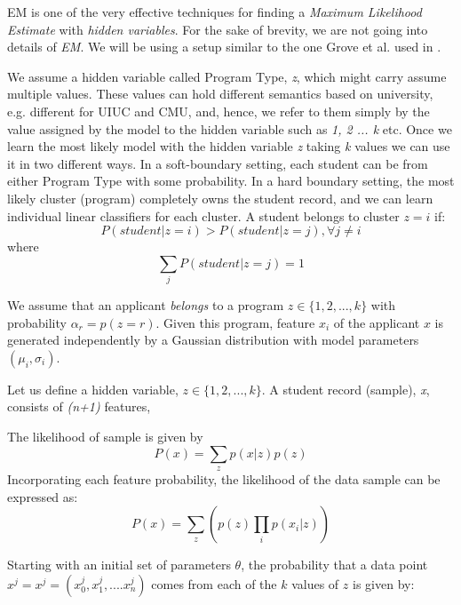 \documentclass{sig-alternate-05-2015}
\begin{document}
EM is one of the very effective techniques for finding a \textit{Maximum Likelihood Estimate} with \textit{hidden variables}. For the sake of brevity, we are not going into details of \textit{EM}. We will be using a setup similar to the one Grove et al. used in \cite{GroveRoth}.

We assume a hidden variable called Program Type, \textit{z}, which might carry assume multiple values. These values can hold different semantics based on university, e.g. different for UIUC and CMU, and, hence, we refer to them simply by the value assigned by the model to the hidden variable such as \textit{1, 2 ... k} etc. Once we learn the most likely model with the hidden variable \textit{z} taking \textit{k} values we can use it in two different ways.  In a soft-boundary setting, each student can be from either Program Type with some probability. In a hard boundary setting, the most likely cluster (program) completely owns the student record, and we can learn individual linear classifiers for each cluster. A student belongs to cluster $z=i$ if:
\begin{equation}P(student | z=i) > P(student | z=j), \forall {j\neq i}\end{equation}
where
\begin{equation}
\sum_j P(student | z=j) = 1
\end{equation}

We assume that an applicant \textit{belongs} to a program $ z \in \{1,2,...,k\} $ with probability $\alpha_r = p(z=r)$. Given this program, feature $x_i$ of the applicant $x$ is generated independently by a Gaussian distribution with model parameters $(\mu_i, \sigma_i)$.

Let us define a hidden variable, $ z \in \{1,2,...,k\} $. A student record (sample), \textit{x}, consists of \textit{(n+1)} features,

The likelihood of sample is given by
\begin{equation}
P(x) = \sum_z p(x | z) p(z)
\end{equation}
Incorporating each feature probability, the likelihood of the data sample can be expressed as:
\begin{equation}
P(x) = \sum_z \left( p(z) \prod_i p(x_i | z) \right)
\end{equation}

Starting with an initial set of parameters $\theta$, the probability that a data point $x^j = x^j = (x_0^j,x_1^j, ....x_n^j)$ comes from each of the $k$ values of $z$ is given by:
\end{document}
